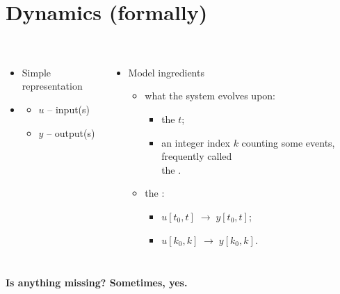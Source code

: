 \section{Dynamics (formally)}
\subsection{}

\begin{frame}
\myPause
 \begin{columns}
   \begin{itemize}[<+-| alert@+>]
   \item[] Simple representation
   \item[] \vspace{2mm}\begin{center}
            
           \end{center}
           \begin{itemize}[<+-| alert@+>]
           \item[] $u$ -- input(s)
           \item[] $y$ -- output(s)
           \end{itemize}
   \end{itemize}
   \begin{itemize}[<+-| alert@+>]
   \item[] Model ingredients
           \begin{itemize}[<+-| alert@+>]
           \item what the system evolves upon:
                 \begin{itemize}[<+-| alert@+>]
                 \item the  $t$;
                 \item an integer index $k$ counting some events,
                       frequently called\\the {}.
                 \end{itemize}
           \item the :
                 \begin{itemize}[<+-| alert@+>]
                 \item $u[t_0,t]\;\rightarrow\;y[t_0,t]$;
                 \item $u[k_0,k]\;\rightarrow\;y[k_0,k]$.
                 \end{itemize}
           \end{itemize}
   \end{itemize}
 \end{columns} \myPause
 \vfill
 \begin{center}
  \vfill \textbf{Is anything missing? \myPause Sometimes, yes.}
 \end{center}
\end{frame}

